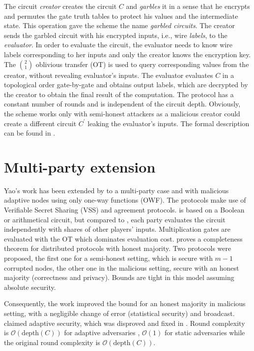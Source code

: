 \documentclass[
  digital, %
  twoside, %
  table,   %
  lof,     %
  lot,     %
]{fithesis3}
\newcommand{\bigO}[0]{\mathcal{O}}
\theoremstyle{definition}
\theoremstyle{remark}
\begin{document}
The circuit \emph{creator} creates the circuit $C$ and \emph{garbles} it in a sense that he encrypts and permutes the gate truth tables to protect his values and the intermediate state. This operation gave the scheme the name \emph{garbled circuits}. The creator sends the garbled circuit with his encrypted inputs, i.e., wire \emph{labels}, to the \emph{evaluator}. In order to evaluate the circuit, the evaluator needs to know wire labels corresponding to her inputs and only the creator knows the encryption key. The $\binom{2}{1}$ oblivious transfer (OT) is used to query corresponding values from the creator, without revealing evaluator's inputs. The evaluator evaluates $C$ in a topological order gate-by-gate and obtains output labels, which are decrypted by the creator to obtain the final result of the computation. The protocol has a constant number of rounds and is independent of the circuit depth. 
Obviously, the scheme works only with semi-honest attackers as a malicious creator could create a different circuit $C^\prime$ leaking the evaluator's inputs. The formal description can be found in \cite{BHR12}. 

\section{Multi-party extension}\label{sec:soa:mpc}%
Yao's work has been extended by \cite{GMW87} to a multi-party case and with malicious adaptive nodes using only one-way functions (OWF). The protocols make use of Verifiable Secret Sharing (VSS) and agreement protocols. \cite{GMW87} is based on a Boolean or arithmetical circuit, but compared to \cite{Yao86}, each party evaluates the circuit independently with shares of other players' inputs. Multiplication gates are evaluated with the OT which dominates evaluation cost. \cite{GMW87} proves a completeness theorem for distributed protocols with honest majority. Two protocols were proposed, the first one for a semi-honest setting, which is secure with $m-1$ corrupted nodes, the other one in the malicious setting, secure with an honest majority (correctness and privacy). Bounds are tight in this model assuming absolute security. 

Consequently, the work \cite{RB89, B91} improved the bound for an honest majority in malicious setting, with a negligible change of error (statistical security) and broadcast.
\cite{RB89} claimed adaptive security, which was disproved and fixed in \cite{CDDHR99}.
Round complexity is $\bigO(\text{depth}(C))$ for adaptive adversaries \cite{GMW87, CDDHR99}, $\bigO(1)$ for static adversaries \cite{BMR90} while the original \cite{GMW87} round complexity is $\bigO(\text{depth}(C))$.
\end{document}
